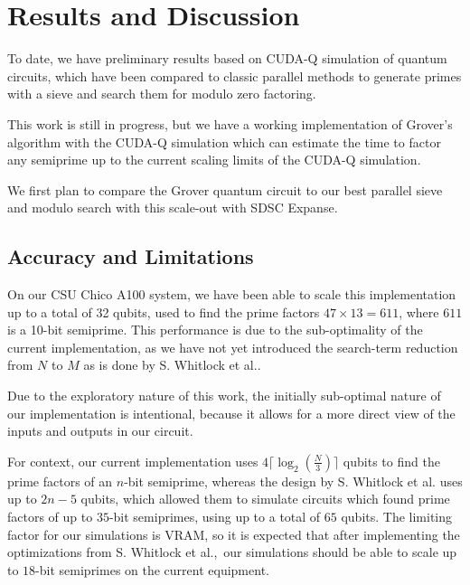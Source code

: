\documentclass[twocolumn]{cinc}
\begin{document}
\section{Results and Discussion}

To date, we have preliminary results based on CUDA-Q simulation of quantum circuits, 
which have been compared to classic parallel methods to generate primes with a sieve 
and search them for modulo zero factoring. 

This work is still in progress, but we have a working implementation of Grover's 
algorithm with the CUDA-Q simulation which can estimate the time to factor any 
semiprime up to the current scaling limits of the CUDA-Q simulation\cite{quantumfactoring_github}. 

We first plan to compare the Grover quantum circuit to our best parallel sieve 
and modulo search with this scale-out with SDSC Expanse.

  \subsection{Accuracy and Limitations}

  On our CSU Chico A100 system, 
  we have been able to scale this implementation up to a total of 32 qubits,
  used to find the prime factors $47\times13=611$, where $611$ is a 10-bit semiprime. This
  performance is due to the sub-optimality of the current implementation, as we have
  not yet introduced the search-term reduction from $N$ to $M$ as is done by S. Whitlock 
  et al.\cite{quantum_factoring}. 

  Due to the exploratory nature of this work, the initially sub-optimal nature of our 
  implementation is intentional, because it allows for a more direct view of the inputs
  and outputs in our circuit.

  For context, our current implementation uses $4 \lceil \log_2(\frac{N}{3})\rceil$ qubits
  to find the prime factors of an $n$-bit semiprime, whereas the design by S. Whitlock 
  et al.\cite{quantum_factoring} uses up to $2n-5$ qubits, which allowed them to simulate circuits which found
  prime factors of up to $35$-bit semiprimes, using up to a total of $65$ qubits. 
  The limiting factor for our simulations is VRAM, so it is expected that after implementing 
  the optimizations from S. Whitlock et al.,\ our simulations should be able to scale up to 
  $18$-bit semiprimes on the current equipment.

\end{document}
